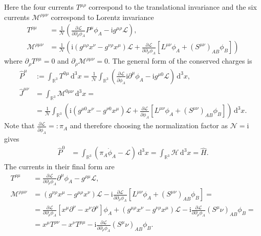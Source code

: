 \documentclass[english, parskip=full]{scrartcl}
\newcommand{\intr}{}
\newcommand{\kla}{}
\newcommand{\klam}{}
\renewcommand{\i}{\text{i}}
\begin{document}
Here the four currents $T^{\mu\rho}$ correspond to the translational invariance and the six currents $\mathcal{M}^{\rho\mu\nu}$ correspond to Lorentz invariance
\begin{align}
T^{\rho\mu} &= \frac{1}{\mathcal{N}} \kla\left( \frac{\partial \mathcal{L}}{\partial \partial_\rho\phi_A}  P^\mu \phi_A - \i g^{\mu\rho} \mathcal{L} \right) ,\\
\mathcal{M}^{\rho\mu\nu} &= \frac{1}{\mathcal{N}} \kla\left( \i \kla\left( g^{\mu\rho} x^\nu - g^{\nu\rho} x^\mu \right) \mathcal{L} + \frac{\partial \mathcal{L}}{\partial \partial_\rho\phi_A} \klam\left[ L^{\mu\nu} \phi_A + (S^{\mu\nu})_{AB} \phi_B \right] \right)
\end{align}
where $\partial_\rho T^{\rho\mu} = 0$ and $\partial_\rho \mathcal{M}^{\rho \mu\nu} = 0$.
The general form of the conserved charges is
\begin{align}
\hat{P}^\mu &:= \intr\int_{\mathbb{R}^{3}} T^{0\mu} \, \mathrm{d}^{3}x =  \frac{1}{\mathcal{N}} \int_{\mathbb{R}^{3}} \kla\left( \frac{\partial \mathcal{L}}{\partial \dot{\phi}_A} \i \partial^\mu \phi_A - \i g^{\mu 0}\mathcal{L} \right)  \, \mathrm{d}^{3}x,\\
\hat{J}^{\mu\nu} &= \intr\int_{\mathbb{R}^{3}} \mathcal{M}^{0\mu\nu} \, \mathrm{d}^{3}x = \\
&= \frac{1}{\mathcal{N}} \intr\int_{\mathbb{R}^{3}} \kla\left( \i \kla\left( g^{\mu 0} x^\nu - g^{\nu 0} x^\mu \right) \mathcal{L} + \frac{\partial \mathcal{L}}{\partial \dot{\phi}_A} \klam\left[ L^{\mu\nu} \phi_A + (S^{\mu\nu})_{AB} \phi_B \right] \right) \, \mathrm{d}^{3}x.
\end{align}
Note that $\frac{\partial\mathcal{L}}{\partial \dot{\phi}_A} =: \pi_A$ and therefore choosing the normalization factor as $\mathcal{N} = \i$ gives
\begin{align}
\hat{P}^0 &= \intr\int_{\mathbb{R}^{3}} \kla\left( \pi_A \dot{\phi}_A - \mathcal{L} \right) \, \mathrm{d}^{3}x = \intr\int_{\mathbb{R}^{3}} \mathcal{H} \, \mathrm{d}^{3}x = \hat{H}.
\end{align}
The currents in their final form are
\begin{align}
T^{\rho\mu} &= \frac{\partial \mathcal{L}}{\partial \partial_\rho \phi_A} \partial^\mu\phi_A - g^{\rho\mu} \mathcal{L} ,\\
\mathcal{M}^{\rho\mu\nu} &= \kla\left( g^{\nu\rho} x^\mu - g^{\mu\rho} x^\nu \right) \mathcal{L} - \i \frac{\partial \mathcal{L}}{\partial \partial_\rho \phi_A} \klam\left[ L^{\mu\nu} \phi_A + (S^{\mu\nu})_{AB}\phi_B \right] = \\
&= \frac{\partial \mathcal{L}}{\partial \partial_\rho \phi_A} \klam\left[ x^\mu\partial^\nu  - x^\nu\partial^\mu  \right]\phi_A + \kla\left( g^{\mu\rho}x^\nu - g^{\nu\rho} x^\mu \right) \mathcal{L} -\i \frac{\partial \mathcal{L}}{\partial \partial_\rho \phi_A} (S^\mu\nu)_{AB} \phi_B = \\
&= x^\mu T^{\rho\nu} - x^\nu T^{\rho\mu} -\i \frac{\partial \mathcal{L}}{\partial \partial_\rho \phi_A} (S^\mu\nu)_{AB} \phi_B.
\end{align}
\end{document}
